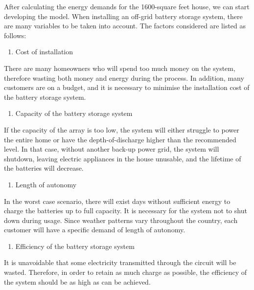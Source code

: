 After calculating the energy demands for the 1600-square feet house, we can start developing the model. When installing an off-grid battery storage system, there are many variables to be taken into account. The factors considered are listed as follows:

\begin{enumerate}
    \item Cost of installation
\end{enumerate}
There are many homeowners who will spend too much money on the system, therefore wasting both money and energy during the process. In addition, many customers are on a budget, and it is necessary to minimise the installation cost of the battery storage system.
\begin{enumerate}[resume]
    \item Capacity of the battery storage system
\end{enumerate}
If the capacity of the array is too low, the system will either struggle to power the entire home or have the depth-of-discharge higher than the recommended level. In that case, without another back-up power grid, the system will shutdown, leaving electric appliances in the house unusable, and the lifetime of the batteries will decrease.
\begin{enumerate}[resume]
    \item Length of autonomy
\end{enumerate}
In the worst case scenario, there will exist days without sufficient energy to charge the batteries up to full capacity. It is necessary for the system not to shut down during usage. Since weather patterns vary throughout the country, each customer will have a specific demand of length of autonomy.
\begin{enumerate}[resume]
    \item Efficiency of the battery storage system
\end{enumerate}
It is unavoidable that some electricity transmitted through the circuit will be wasted. Therefore, in order to retain as much charge as possible, the efficiency of the system should be as high as can be achieved.